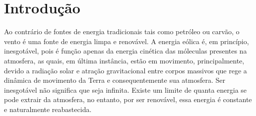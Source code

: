 \documentclass[
	12pt,				%
	openright,			%
	oneside,			%
	a4paper,			%
	english,			%
	french,				%
	spanish,			%
	brazil				%
	]{abntex2}
\begin{document}
\tableofcontents*



\textual

\chapter*[Introdução]{Introdução}



Ao contrário de fontes de energia tradicionais tais como petróleo ou carvão, o vento é uma fonte de energia limpa e renovável. A energia eólica é, em princípio, inesgotável, pois é função apenas da energia cinética das móleculas presentes na atmosfera, as quais, em última instância, estão em movimento, principalmente, devido a radiação solar e atração gravitacional entre corpos massivos que rege a dinâmica de movimento da Terra e consequentemente sua atmosfera. Ser inesgotável não significa que seja infinita. Existe um limite de quanta energia se pode extrair da atmosfera, no entanto, por ser renovável, essa energia é constante e naturalmente reabastecida.
\end{document}
